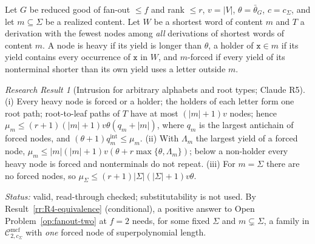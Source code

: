 \documentclass[11pt]{article}
\numberwithin{equation}{section}
\theoremstyle{plain}
\theoremstyle{definition}
\theoremstyle{remark}
\newtheorem{rresult}[theorem]{Research Result}
\newcommand{\Cmcf}[2]{\mathcal{C}^{\mathrm{mcf}}_{#1,#2}}
\theoremstyle{plain}
\begin{document}
Let $G$ be reduced good of fan-out $\le f$ and rank $\le r$, $v=|V|$,
$\theta=\bar\theta_G$, $c=c_\Sigma$, and let $m\subseteq\Sigma$ be a realized content.  Let
$W$ be a shortest word of content $m$ and $T$ a derivation with the fewest nodes among
\emph{all} derivations of shortest words of content $m$.  A node is heavy if its yield is
longer than $\theta$, a holder of $\mathtt x\in m$ if its yield contains every occurrence of
$\mathtt x$ in $W$, and $m$-forced if every yield of its nonterminal shorter than its own
yield uses a letter outside $m$.

\begin{rresult}[Intrusion for arbitrary alphabets and root types; Claude R5]
\label{rr:R5-intrusion}
(i) Every heavy node is forced or a holder; the holders of each letter form one root path;
root-to-leaf paths of $T$ have at most $(|m|+1)v$ nodes; hence
$\mu_m\le(r+1)(|m|+1)v\theta(q_m+|m|)$, where $q_m$ is the largest antichain of forced
nodes, and $(\theta+1)q^{\mathrm{int}}_m\le\mu_m$.  (ii) With $\Lambda_m$ the largest yield
of a forced node, $\mu_m\le|m|(|m|+1)v(\theta+r\max\{\theta,\Lambda_m\})$; below a
non-holder every heavy node is forced and nonterminals do not repeat.  (iii) For
$m=\Sigma$ there are no forced nodes, so $\mu_\Sigma\le(r+1)|\Sigma|(|\Sigma|+1)v\theta$.
\end{rresult}
\noindent\emph{Status:} valid, read-through checked; substitutability is not used.  By
Result~\ref{rr:R4-equivalence} (conditional), a positive answer to
Open Problem~\ref{op:fanout-two} at $f=2$ needs, for some fixed $\Sigma$ and
$m\subsetneq\Sigma$, a family in $\Cmcf{2}{c_\Sigma}$ with \emph{one} forced node of
superpolynomial length.
\end{document}
